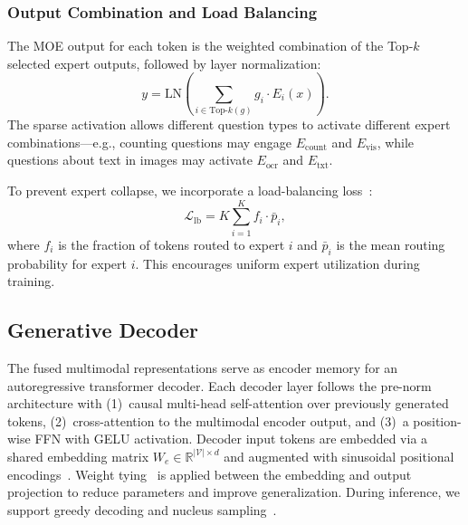 \subsubsection{Output Combination and Load Balancing}
\label{sec:method:fusion:output}

The MOE output for each token is the weighted combination of the Top-$k$ selected expert outputs, followed by layer normalization:
\begin{equation}
    y = \text{LN}\!\left(\sum_{i \in \text{Top-}k(g)} g_i \cdot E_i(x)\right).
    \label{eq:moe_output}
\end{equation}
The sparse activation allows different question types to activate different expert combinations---e.g., counting questions may engage $E_{\text{count}}$ and $E_{\text{vis}}$, while questions about text in images may activate $E_{\text{ocr}}$ and $E_{\text{txt}}$.

To prevent expert collapse, we incorporate a load-balancing loss~\cite{shazeer2017outrageously, fedus2022switch}:
\begin{equation}
    \mathcal{L}_{\text{lb}} = K \sum_{i=1}^{K} f_i \cdot \bar{p}_i,
    \label{eq:load_balance}
\end{equation}
where $f_i$ is the fraction of tokens routed to expert $i$ and $\bar{p}_i$ is the mean routing probability for expert $i$. This encourages uniform expert utilization during training.

\subsection{Generative Decoder}
\label{sec:method:decoder}

The fused multimodal representations serve as encoder memory for an autoregressive transformer decoder. Each decoder layer follows the pre-norm architecture with (1)~causal multi-head self-attention over previously generated tokens, (2)~cross-attention to the multimodal encoder output, and (3)~a position-wise FFN with GELU activation. Decoder input tokens are embedded via a shared embedding matrix $W_e \in \mathbb{R}^{|\mathcal{V}| \times d}$ and augmented with sinusoidal positional encodings~\cite{vaswani2017attention}. Weight tying~\cite{press2017using} is applied between the embedding and output projection to reduce parameters and improve generalization. During inference, we support greedy decoding and nucleus sampling~\cite{holtzman2020curious}.

